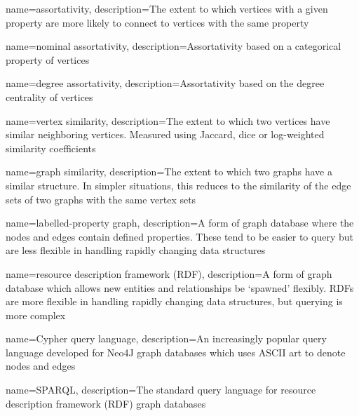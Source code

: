 {
    name={assortativity},
    description={The extent to which vertices with a given property are more likely to connect to vertices with the same property}
}

{
    name={nominal assortativity},
    description={Assortativity based on a categorical property of vertices}
}

{
    name={degree assortativity},
    description={Assortativity based on the degree centrality of vertices}
}

{
    name={vertex similarity},
    description={The extent to which two vertices have similar neighboring vertices.  Measured using Jaccard, dice or log-weighted similarity coefficients}
}

{
    name={graph similarity},
    description={The extent to which two graphs have a similar structure.  In simpler situations, this reduces to the similarity of the edge sets of two graphs with the same vertex sets}
}

{
    name={labelled-property graph},
    description={A form of graph database where the nodes and edges contain defined properties.  These tend to be easier to query but are less flexible in handling rapidly changing data structures}
}

{
    name={resource description framework (RDF)},
    description={A form of graph database which allows new entities and relationships be `spawned' flexibly.  RDFs are more flexible in handling rapidly changing data structures, but querying is more complex}
}

{
    name={Cypher query language},
    description={An increasingly popular query language developed for Neo4J graph databases which uses ASCII art to denote nodes and edges}
}

{
    name={SPARQL},
    description={The standard query language for resource description framework (RDF) graph databases}
}



\glsaddall

\usepackage{tcolorbox}


  
\usepackage{footnote}
\usepackage{etoolbox}

\frontmatter
